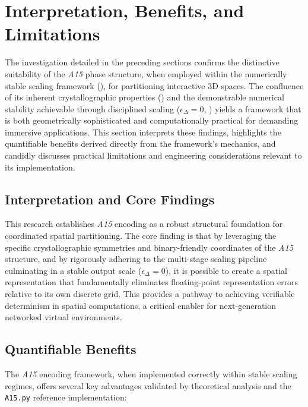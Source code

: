 \documentclass[10pt]{article}
\def\AAAB{\textit{A15}}
\begin{document}
\section{Interpretation, Benefits, and Limitations}\label{sec-discussion}

The investigation detailed in the preceding sections confirms the distinctive suitability of the \AAAB{} phase structure, when employed within the numerically stable scaling framework (), for partitioning interactive 3D spaces. The confluence of its inherent crystallographic properties () and the demonstrable numerical stability achievable through disciplined scaling ($\epsilon_\Delta = 0$, ) yields a framework that is both geometrically sophisticated and computationally practical for demanding immersive applications. This section interprets these findings, highlights the quantifiable benefits derived directly from the framework's mechanics, and candidly discusses practical limitations and engineering considerations relevant to its implementation.

\subsection{Interpretation and Core Findings}\label{subsec-discussion-interpretation}

This research establishes \AAAB{} encoding as a robust structural foundation for coordinated spatial partitioning. The core finding is that by leveraging the specific crystallographic symmetries and binary-friendly coordinates of the \AAAB{} structure, and by rigorously adhering to the multi-stage scaling pipeline culminating in a stable output scale ($\epsilon_\Delta = 0$), it is possible to create a spatial representation that fundamentally eliminates floating-point representation errors relative to its own discrete grid. This provides a pathway to achieving verifiable determinism in spatial computations, a critical enabler for next-generation networked virtual environments.

\subsection{Quantifiable Benefits}\label{subsec-discussion-benefits}

The \AAAB{} encoding framework, when implemented correctly within stable scaling regimes, offers several key advantages validated by theoretical analysis and the \texttt{A15.py} \cite{Risinger2024A15} reference implementation:
\end{document}
